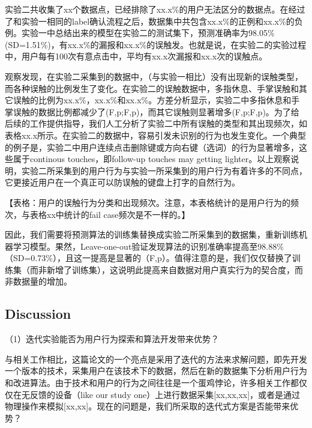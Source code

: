 
实验二共收集了xx个数据点，已经排除了xx.x\%的用户无法区分的数据点。在经过了和实验一相同的label确认流程之后，数据集中共包含xx.x\%的正例和xx.x\%的负例。实验一中总结出来的模型在实验二的测试集下，预测准确率为98.05\%(SD=1.51\%)，有xx.x\%的漏报和xx.x\%的误触发。也就是说，在实验二的实验过程中，用户每有100次有意点击中，平均有xx.x次漏报和xx.x次的误触点。

观察发现，在实验二采集到的数据中，（与实验一相比）没有出现新的误触类型，而各种误触的比例发生了变化。在实验二的误触数据中，多指休息、手掌误触和其它误触的比例为xx.x\%，xx.x\%和xx.x\%。方差分析显示，实验二中多指休息和手掌误触的数据比例都减少了(F,p;F,p)，而其它误触则显著增多(F,p;F,p)。为了给后续的工作提供指导，我们人工分析了实验二中所有误触的类型和其出现频次，如表格xx.x所示。在实验二的数据中，容易引发未识别的行为也发生变化。一个典型的例子是，实验二中用户连续点击删除键或方向右键（选词）的行为显著增多，这些属于continous touches，即follow-up touches may getting lighter。以上观察说明，实验二所采集到的用户行为与实验一所采集到的用户行为有着许多的不同点，它更接近用户在一个真正可以防误触的键盘上打字的自然行为。

【表格：用户的误触行为分类和出现频次。注意，本表格统计的是用户行为的频次，与表格xx中统计的fail case频次是不一样的。】

因此，我们需要将预测算法的训练集替换成实验二所采集到的数据集，重新训练机器学习模型。果然，Leave-one-out验证发现算法的识别准确率提高至98.88\%（SD=0.73\%），且这一提高是显著的（F,p）。值得注意的是，我们仅仅替换了训练集（而非新增了训练集），这说明此提高来自数据对用户真实行为的契合度，而非数据量的增加。

\subsection{Discussion}

（1）迭代实验能否为用户行为探索和算法开发带来优势？

与相关工作相比，这篇论文的一个亮点是采用了迭代的方法来求解问题，即先开发一个版本的技术，采集用户在该技术下的数据，然后在新的数据集下分析用户行为和改进算法。由于技术和用户的行为之间往往是一个蛋鸡悖论，许多相关工作都仅仅在无反馈的设备（like our study one）上进行数据采集[xx,xx,xx]，或者是通过物理操作来模拟[xx,xx]。现在的问题是，我们所采取的迭代式方案是否能带来优势？

